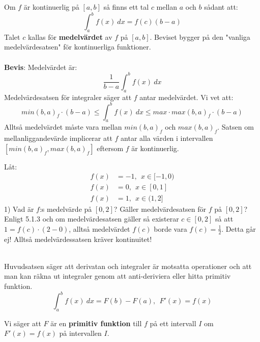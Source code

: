 \documentclass{report}
\begin{document}
{
	Om $ f $ är kontinuerlig på $ [a,b] $ så finns ett tal $ c $ mellan $ a $ och $ b $ sådant att:
	\begin{equation*}
	\int_{a}^{b} f(x) \: dx = f(c)(b-a) 
	\end{equation*}
	Talet $ c $ kallas för \textbf{medelvärdet} av $ f $ på $ [a,b] $. Beviset bygger på den "vanliga medelvärdesatsen" för kontinuerliga funktioner.\\\\


\textbf{Bevis}:
Medelvärdet är:
\begin{equation*}
\frac{1}{b-a} \int_{a}^{b} f(x) \: dx 
\end{equation*}
Medelvärdesatsen för integraler säger att $ f $ antar medelvärdet. Vi vet att:
\begin{equation*}
min(b,a)_f \cdot (b-a) \le \int_{a}^{b} f(x) \: dx \le max \cdot max(b,a)_f \cdot (b-a)
\end{equation*}
Alltså medelvärdet måste vara mellan $ min(b,a)_f $ och $ max(b,a)_f $. Satsen om mellanliggandevärde implicerar att $ f $ antar alla värden i intervallen $ [min(b,a)_f, max(b,a)_f] $ eftersom $ f $ är kontinuerlig. 
}

\ex{}
{
Låt:
\begin{align*}
	f(x) &= -1,\:\: x \in [-1,0)\\
	f(x) &= 0, \:\: x \in [0,1]\\
	f(x) &= 1, \:\: x \in (1,2]
\end{align*}
1) Vad är $ f $:s medelvärde på $ [0,2] $? Gäller medelvärdesatsen för $ f $ på $ [0,2] $?\\
Enligt 5.1.3 och om medelvärdesatsen gäller så existerar $ c \in [0,2]	 $ så att $ 1 = f(c) \cdot (2-0) $, alltså medelvärdet $ f(c) $ borde vara $ f(c) = \frac{1}{2}  $. Detta går ej! Alltså medelvärdessatsen kräver kontinuitet!\\\\
}

{
Huvudsatsen säger att derivatan och integraler är motsatta operationer och att man kan räkna ut integraler genom att anti-deriviera eller hitta primitiv funktion.
\begin{equation*}
\int_{a}^{b} f(x) \: dx = F(b) - F(a),\:\: F'(x) = f(x) 
\end{equation*}
}

{
Vi säger att $ F $ är en \textbf{primitiv funktion} till $ f $ på ett intervall $ I $ om $ F'(x) = f(x) $ på intervallen $ I $.
}
\end{document}
